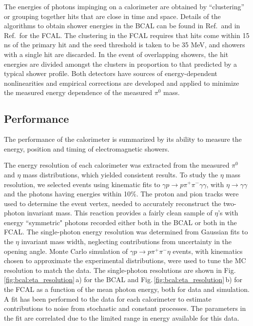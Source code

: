 The energies of photons impinging on a calorimeter are obtained by ``clustering'' or grouping together hits that are close in time and space. Details of the algorithms to obtain shower energies in the BCAL can be found in Ref.\,\cite{BEATTIE201824}  and in Ref.\,\cite{Jones:2006ru} for the FCAL. The clustering in the FCAL requires that hits come within 15 ns of the primary hit and the seed threshold is taken to be 35 MeV, and showers with a single hit are discarded. In the event of overlapping showers, the hit energies are divided amongst the clusters in proportion to that predicted by a typical shower profile. Both detectors have sources of energy-dependent nonlinearities and empirical corrections are developed and applied to minimize the measured energy dependence of the measured $\pi^0$ mass.  


\subsection{Performance \label{sec:calperformance}}
The performance of the calorimeter is summarized by its ability to measure the energy, position and timing of electromagnetic showers.

The energy resolution of each calorimeter was extracted from the measured $\pi^0$ and $\eta$ mass distributions, which yielded consistent results. 
To study the $\eta$ mass resolution, we selected events using kinematic fits to $\gamma p \rightarrow p \pi^+ \pi^- \gamma \gamma$, with $\eta\rightarrow \gamma\gamma$ and the photons having energies within 10\%.
The proton and pion tracks were used to determine the event vertex, needed to accurately reconstruct the two-photon invariant mass.
This reaction provides a fairly clean sample of $\eta$'s with energy ``symmetric" photons recorded either both in the BCAL or both in the FCAL. 
The single-photon energy resolution was determined from Gaussian fits to the $\eta$ invariant mass width, neglecting contributions from uncertainty in the opening angle.
Monte Carlo simulation of $\gamma p \rightarrow p \pi^+ \pi^- \eta$ events, with kinematics chosen to approximate the experimental distributions, were used to tune the MC resolution to match the data. 
The single-photon resolutions are shown in Fig.\,\ref{fig:bcal:eta_resolution}\,a) for the BCAL and Fig.\,\ref{fig:bcal:eta_resolution}\,b) for the FCAL as a function of the mean photon energy, both for data and simulation.
A fit has been performed to the data for each calorimeter to estimate contributions to noise from stochastic and constant processes.  The parameters in the fit are correlated due to the limited range in energy available for this data.

